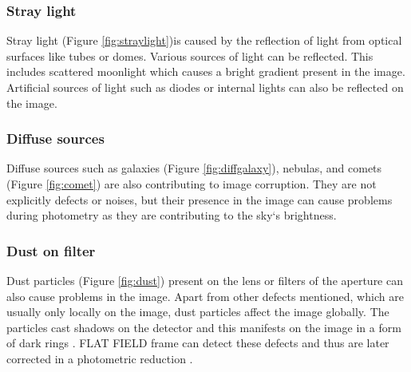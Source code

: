     
    \subsubsection{Stray light} 

    Stray light (Figure \ref{fig:straylight})is caused by the reflection of light from optical surfaces like tubes or domes. Various sources of light can be reflected. This includes scattered moonlight which causes a bright gradient present in the image. Artificial sources of light such as diodes or internal lights can also be reflected on the image.
    
    \subsubsection{Diffuse sources} 
    
    Diffuse sources such as galaxies (Figure \ref{fig:diffgalaxy}), nebulas, and comets (Figure \ref{fig:comet}) are also contributing to image corruption. They are not explicitly defects or noises, but their presence in the image can cause problems during photometry as they are contributing to the sky‘s brightness. 

        
    \subsubsection{Dust on filter}
    
    Dust particles (Figure \ref{fig:dust}) present on the lens or filters of the aperture can also cause problems in the image. Apart from other defects mentioned, which are usually only locally on the image, dust particles affect the image globally. The particles cast shadows on the detector and this manifests on the image in a form of dark rings \cite{articleCCDartifacts}.
    FLAT FIELD frame can detect these defects and thus are later corrected in a photometric reduction \cite{articleParimucha}.
    
